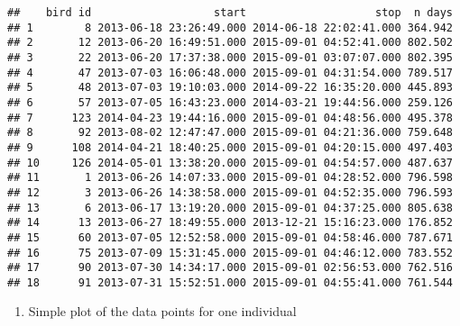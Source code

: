 \documentclass[
]{article}
\newenvironment{Shaded}{\begin{snugshade}}{\end{snugshade}}
\newcommand{\CommentTok}[1]{\textcolor[rgb]{0.56,0.35,0.01}{\textit{#1}}}
\newcommand{\DecValTok}[1]{\textcolor[rgb]{0.00,0.00,0.81}{#1}}
\newcommand{\FunctionTok}[1]{\textcolor[rgb]{0.13,0.29,0.53}{\textbf{#1}}}
\newcommand{\NormalTok}[1]{#1}
\newcommand{\OtherTok}[1]{\textcolor[rgb]{0.56,0.35,0.01}{#1}}
\newcommand{\SpecialCharTok}[1]{\textcolor[rgb]{0.81,0.36,0.00}{\textbf{#1}}}
\providecommand{\tightlist}{%
  \setlength{\itemsep}{0pt}\setlength{\parskip}{0pt}}
\begin{document}
\begin{verbatim}
##    bird id                   start                    stop  n days
## 1        8 2013-06-18 23:26:49.000 2014-06-18 22:02:41.000 364.942
## 2       12 2013-06-20 16:49:51.000 2015-09-01 04:52:41.000 802.502
## 3       22 2013-06-20 17:37:38.000 2015-09-01 03:07:07.000 802.395
## 4       47 2013-07-03 16:06:48.000 2015-09-01 04:31:54.000 789.517
## 5       48 2013-07-03 19:10:03.000 2014-09-22 16:35:20.000 445.893
## 6       57 2013-07-05 16:43:23.000 2014-03-21 19:44:56.000 259.126
## 7      123 2014-04-23 19:44:16.000 2015-09-01 04:48:56.000 495.378
## 8       92 2013-08-02 12:47:47.000 2015-09-01 04:21:36.000 759.648
## 9      108 2014-04-21 18:40:25.000 2015-09-01 04:20:15.000 497.403
## 10     126 2014-05-01 13:38:20.000 2015-09-01 04:54:57.000 487.637
## 11       1 2013-06-26 14:07:33.000 2015-09-01 04:28:52.000 796.598
## 12       3 2013-06-26 14:38:58.000 2015-09-01 04:52:35.000 796.593
## 13       6 2013-06-17 13:19:20.000 2015-09-01 04:37:25.000 805.638
## 14      13 2013-06-27 18:49:55.000 2013-12-21 15:16:23.000 176.852
## 15      60 2013-07-05 12:52:58.000 2015-09-01 04:58:46.000 787.671
## 16      75 2013-07-09 15:31:45.000 2015-09-01 04:46:12.000 783.552
## 17      90 2013-07-30 14:34:17.000 2015-09-01 02:56:53.000 762.516
## 18      91 2013-07-31 15:52:51.000 2015-09-01 04:55:41.000 761.544
\end{verbatim}

\begin{enumerate}
\def\labelenumi{\alph{enumi}.}
\setcounter{enumi}{4}
\tightlist
\item
  Simple plot of the data points for one individual
\end{enumerate}

\begin{Shaded}
\end{Shaded}
\end{document}
